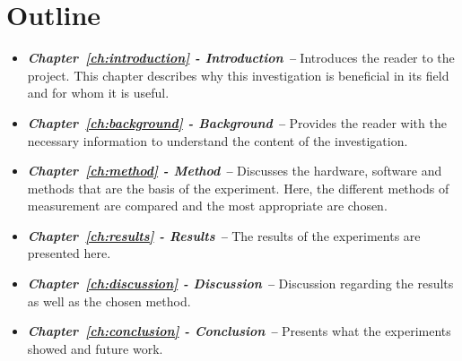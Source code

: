 \section{Outline}
\begin{itemize}
    \item \textit{\textbf{Chapter~\ref{ch:introduction} - Introduction --}} Introduces the reader to the project. This chapter describes why this investigation is beneficial in its field and for whom it is useful.
    \item \textit{\textbf{Chapter~\ref{ch:background} - Background --}} Provides the reader with the necessary information to understand the content of the investigation.
    \item \textit{\textbf{Chapter~\ref{ch:method} - Method --}} Discusses the hardware, software and methods that are the basis of the experiment. Here, the different methods of measurement are compared and the most appropriate are chosen.
    \item \textit{\textbf{Chapter~\ref{ch:results} - Results --}} The results of the experiments are presented here.
    \item \textit{\textbf{Chapter~\ref{ch:discussion} - Discussion --}} Discussion regarding the results as well as the chosen method.
    \item \textit{\textbf{Chapter~\ref{ch:conclusion} - Conclusion --}} Presents what the experiments showed and future work.
\end{itemize}
